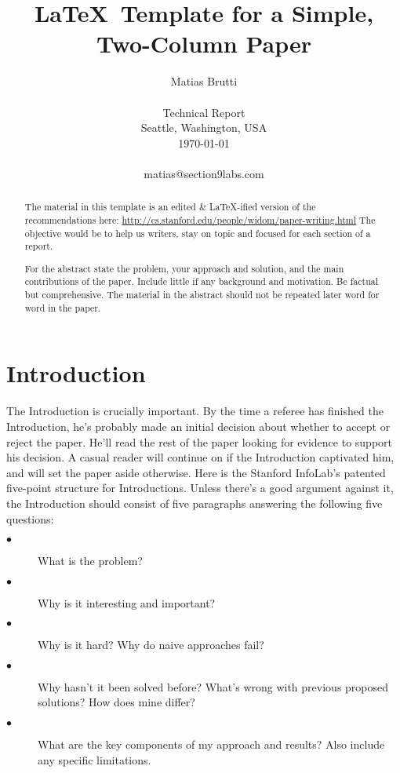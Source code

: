 \documentclass[10pt,twocolumn]{article}
\begin{document}
\title{\LaTeX\ Template for a Simple, Two-Column Paper}

\author{Matias Brutti \\
\\
Technical Report \\
Seattle, Washington, USA \\
\today
\\
\\
matias@section9labs.com  \\
}

\maketitle
\thispagestyle{empty}

\begin{abstract}
The material in this template is an edited \& \LaTeX\--ified version of the recommendations here: \url{http://cs.stanford.edu/people/widom/paper-writing.html} The objective would be to help us writers, stay on topic and focused for each section of a report.

For the abstract state the problem, your approach and solution, and the main contributions of the paper. Include little if any background and motivation. Be factual but comprehensive. The material in the abstract should not be repeated later word for word in the paper. 
\end{abstract}


\section{Introduction}
The Introduction is crucially important. By the time a referee has finished the Introduction, he's probably made an initial decision about whether to accept or reject the paper. He'll read the rest of the paper looking for evidence to support his decision. A casual reader will continue on if the Introduction captivated him, and will set the paper aside otherwise. 
Here is the Stanford InfoLab's patented five-point structure for Introductions. Unless there's a good argument against it, the Introduction should consist of five paragraphs answering the following five questions:

\begin{description}
  \item[$\bullet$]  What is the problem?
  \item[$\bullet$]  Why is it interesting and important?
  \item[$\bullet$]  Why is it hard? Why do naive approaches fail?
  \item[$\bullet$]  Why hasn't it been solved before? What's wrong with previous proposed solutions? How does mine differ?
  \item[$\bullet$]  What are the key components of my approach and results? Also include any specific limitations.
\end{description}
  
\end{document}
